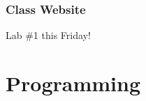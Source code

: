 \documentclass[11pt]{beamer}
\begin{document}
\begin{frame}[plain,c]
  \frametitle{Class Website}
  \Enlarge

  \begin{center}
    \textcolor{\CSBase}{\Huge Lab \#1 this Friday!}
  \end{center}
\end{frame}

\section{Programming}









\end{document}
